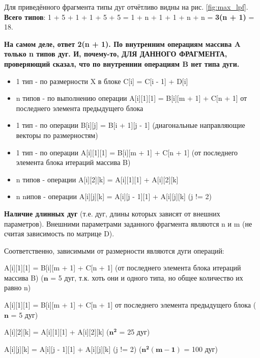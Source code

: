 \documentclass[12pt, fleqn]{article}
\theoremstyle{definition}
\newenvironment{packed_enum}{
\begin{enumerate}
  \setlength{\itemsep}{1pt}
  \setlength{\parskip}{0pt}
  \setlength{\parsep}{0pt}
}{\end{enumerate}}
\begin{document}
\begin{packed_enum}
 Для приведённого фрагмента типы дуг отчётливо видны на рис. \ref{fig:max_lpf}. \textbf{Всего типов}: 1 + 5 + 1 + 1 + 5 + 5 = 1 + n + 1 + 1 + n + n = \textbf{3(n + 1)} = 18.
 
 \textbf{На самом деле, ответ 2(n + 1). По внутренним операциям массива A только n типов дуг. И, почему-то, ДЛЯ ДАННОГО ФРАГМЕНТА, проверяющий сказал, что по внутреннии операциям B нет типа дуги.}
 
 \begin{itemize}
  \item 1 тип - по размерности X в блоке C[i] = C[i - 1] + D[i]
  \item n типов - по выполнению операции A[i][1][1] = B[i][m + 1] + C[n + 1] от последнего элемента предыдущего блока
  \item 1 тип - по операции B[i][j] = B[i + 1][j - 1] (диагональные направляющие векторы по размерностям)
  \item 1 тип - по операции A[i][1][1] = B[i][m + 1] + C[n + 1] (от последнего элемента блока итераций массива B)
  \item n типов - операции A[i][2][k] = A[i][1][1] + A[i][2][k]
  \item n nипов - операции A[i][j][k] = A[i][j - 1][1] + A[i][j][k] (j != 2)
 \end{itemize}

 \item \textbf{Наличие длинных дуг} (т.е. дуг, длины которых зависят от внешних параметров). Внешними параметрами заданного фрагмента являются n и m (не считая зависимость по матрице D).
 
 Соответственно, зависимыми от размерности являются дуги операций:
 \begin{packed_enum}
  \item \label{enum:t1} A[i][1][1] = B[i][m + 1] + C[n + 1] (от последнего элемента блока итераций массива B) ($\mathbf{n}$ = 5 дуг, т.к. хоть они и одного типа, но общее количество их равно n)
  \item \label{enum:t2} A[i][1][1] = B[i][m + 1] + C[n + 1] от последнего элемента предыдущего блока ($\mathbf{n}$ = 5 дуг)
  \item \label{enum:t3} A[i][2][k] = A[i][1][1] + A[i][2][k] ($\mathbf{n^2}$ = 25 дуг)
  \item \label{enum:t4} A[i][j][k] = A[i][j - 1][1] + A[i][j][k] (j != 2) ($\mathbf{n^2 (m - 1)}$ = 100 дуг)
 \end{packed_enum}
 

\end{packed_enum}
\end{document}
